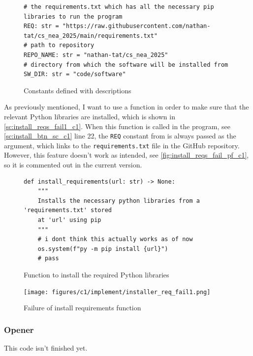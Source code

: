 \documentclass[11pt]{article}
\begin{document}
                \begin{figure}[!ht]
                   \begin{verbatim}
# the requirements.txt which has all the necessary pip libraries to run the program 
REQ: str = "https://raw.githubusercontent.com/nathan-tat/cs_nea_2025/main/requirements.txt"
# path to repository
REPO_NAME: str = "nathan-tat/cs_nea_2025"
# directory from which the software will be installed from 
SW_DIR: str = "code/software"
                   \end{verbatim}
                   \caption{Constants defined with descriptions}
                   \label{sc:consts_install_c1}
                \end{figure}

                As previously mentioned, I want to use a function in order to make sure that the relevant Python libraries are installed, which is shown in \autoref{sc:install_reqs_fail1_c1}. When this function is called in the program, see \autoref{sc:install_btn_sc_c1} line 22, the \verb|REQ| constant from is always passed as the argument, which links to the \verb|requirements.txt| file in the GitHub repository. However, this feature doesn't work as intended, see \autoref{fig:install_reqs_fail_pf_c1}, so it is commented out in the current version.

                \begin{figure}[!ht]
                   \begin{verbatim}
def install_requirements(url: str) -> None:
    """ 
    Installs the necessary python libraries from a 'requirements.txt' stored  
    at 'url' using pip
    """
    # i dont think this actually works as of now
    os.system(f"py -m pip install {url}")
    # pass
                   \end{verbatim}
                   \caption{Function to install the required Python libraries}
                   \label{sc:install_reqs_fail1_c1}
                \end{figure}

                \begin{figure}[!ht]
                    \centering
                    \texttt{[image: figures/c1/implement/installer\_req\_fail1.png]}
                    \caption{Failure of install requirements function}
                    \label{fig:install_reqs_fail_pf_c1}
                \end{figure}
                

            \subsubsection{Opener}
                This code isn't finished yet.
\end{document}
